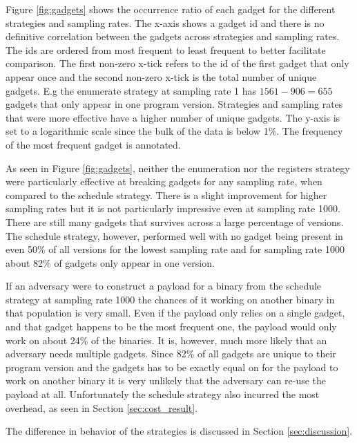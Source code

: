 Figure \ref{fig:gadgets} shows the occurrence ratio of each gadget for the different
strategies and sampling rates. The x-axis shows a gadget id and there is no definitive
correlation between the gadgets across strategies and sampling rates. The ids are ordered
from most frequent to least frequent to better facilitate comparison. The first non-zero
x-tick refers to the id of the first gadget that only appear once and the second non-zero
x-tick is the total number of unique gadgets. E.g the enumerate strategy at sampling rate
1 has $1561-906=655$ gadgets that only appear in one program version. Strategies and
sampling rates that were more effective have a higher number of unique gadgets. The y-axis
is set to a logarithmic scale since the bulk of the data is below 1\%. The frequency of
the most frequent gadget is annotated.

As seen in Figure \ref{fig:gadgets}, neither the enumeration nor the registers strategy
were particularly effective at breaking gadgets for any sampling rate, when compared to
the schedule strategy. There is a slight improvement for higher sampling rates but it is
not particularly impressive even at sampling rate 1000. There are still many gadgets that
survives across a large percentage of versions. The schedule strategy, however, performed
well with no gadget being present in even 50\% of all versions for the lowest sampling
rate and for sampling rate 1000 about 82\% of gadgets only appear in one version.

If an adversary were to construct a payload for a binary from the schedule strategy
at sampling rate 1000 the chances of it working on another binary in that population is
very small. Even if the payload only relies on a single gadget, and that gadget happens
to be the most frequent one, the payload would only work on about 24\% of the binaries. It
is, however, much more likely that an adversary needs multiple gadgets. Since 82\% of
all gadgets are unique to their program version and the gadgets has to be exactly equal on
for the payload to work on another binary it is very unlikely that the adversary can re-use
the payload at all. Unfortunately the schedule strategy also incurred the most overhead,
as seen in Section \ref{sec:cost_result}.

The difference in behavior of the strategies is discussed in Section \ref{sec:discussion}.
